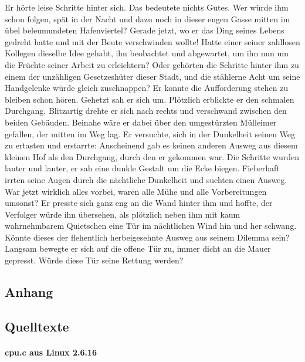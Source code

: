 Er hörte leise Schritte hinter sich. Das bedeutete nichts Gutes. Wer würde ihm schon folgen, spät in der Nacht und dazu noch in dieser engen Gasse mitten im übel beleumundeten Hafenviertel? Gerade jetzt, wo er das Ding seines Lebens gedreht hatte und mit der Beute verschwinden wollte! Hatte einer seiner zahllosen Kollegen dieselbe Idee gehabt, ihn beobachtet und abgewartet, um ihn nun um die Früchte seiner Arbeit zu erleichtern? Oder gehörten die Schritte hinter ihm zu einem der unzähligen Gesetzeshüter dieser Stadt, und die stählerne Acht um seine Handgelenke würde gleich zuschnappen? Er konnte die Aufforderung stehen zu bleiben schon hören. Gehetzt sah er sich um. Plötzlich erblickte er den schmalen Durchgang. Blitzartig drehte er sich nach rechts und verschwand zwischen den beiden Gebäuden. Beinahe wäre er dabei über den umgestürzten Mülleimer gefallen, der mitten im Weg lag. Er versuchte, sich in der Dunkelheit seinen Weg zu ertasten und erstarrte: Anscheinend gab es keinen anderen Ausweg aus diesem kleinen Hof als den Durchgang, durch den er gekommen war. Die Schritte wurden lauter und lauter, er sah eine dunkle Gestalt um die Ecke biegen. Fieberhaft irrten seine Augen durch die nächtliche Dunkelheit und suchten einen Ausweg. War jetzt wirklich alles vorbei, waren alle Mühe und alle Vorbereitungen umsonst? Er presste sich ganz eng an die Wand hinter ihm und hoffte, der Verfolger würde ihn übersehen, als plötzlich neben ihm mit kaum wahrnehmbarem Quietschen eine Tür im nächtlichen Wind hin und her schwang. Könnte dieses der flehentlich herbeigesehnte Ausweg aus seinem Dilemma sein? Langsam bewegte er sich auf die offene Tür zu, immer dicht an die Mauer gepresst. Würde diese Tür seine Rettung werden?


\begin{landscape}\begin{multicols}{2}
\appendix
\chapter{Anhang}
\section{Quelltexte}
\subsubsection*{cpu.c aus Linux 2.6.16}\label{s.cpu}
\end{multicols}\end{landscape}


